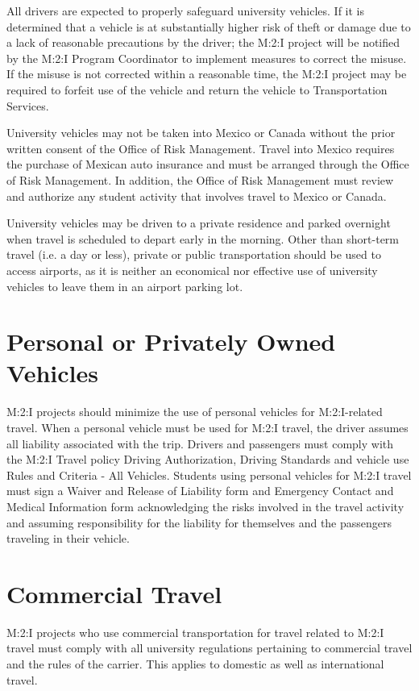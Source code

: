 {All drivers are expected to properly safeguard university vehicles. If it is determined that a vehicle is at substantially higher risk of theft or damage due to a lack of reasonable precautions by the driver; the M:2:I project will be notified by the M:2:I Program Coordinator to implement measures to correct the misuse. If the misuse is not corrected within a reasonable time, the M:2:I project may be required to forfeit use of the vehicle and return the vehicle to Transportation Services.

University vehicles may not be taken into Mexico or Canada without the prior written consent of the Office of Risk Management. Travel into Mexico requires the purchase of Mexican auto insurance and must be arranged through the Office of Risk Management. In addition, the Office of Risk Management must review and authorize any student activity that involves travel to Mexico or Canada.

University vehicles may be driven to a private residence and parked overnight when travel is scheduled to depart early in the morning. Other than short-term travel (i.e. a day or less), private or public transportation should be used to access airports, as it is neither an economical nor effective use of university vehicles to leave them in an airport parking lot.

\section{Personal or Privately Owned Vehicles}

M:2:I projects should minimize the use of personal vehicles for M:2:I-related travel. When a personal vehicle must be used for M:2:I travel, the driver assumes all liability associated with the trip. Drivers and passengers must comply with the M:2:I Travel policy Driving Authorization, Driving Standards and vehicle use Rules and Criteria - All Vehicles. Students using personal vehicles for M:2:I travel must sign a Waiver and Release of Liability form and Emergency Contact and Medical Information form acknowledging the risks involved in the travel activity and assuming responsibility for the liability for themselves and the passengers traveling in their vehicle.

\section{Commercial Travel}
M:2:I projects who use commercial transportation for travel related to M:2:I travel must comply with all university regulations pertaining to commercial travel and the rules of the carrier. This applies to domestic as well as international travel.

}
